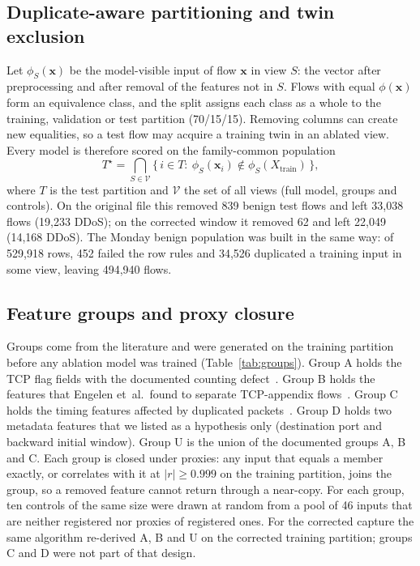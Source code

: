\documentclass[journal]{IEEEtran}
\newcommand{\Tstar}{T^{\star}}
\begin{document}
\subsection{Duplicate-aware partitioning and twin exclusion}
Let $\phi_S(\mathbf{x})$ be the model-visible input of flow $\mathbf{x}$ in view $S$: the vector
after preprocessing and after removal of the features not in $S$. Flows with equal
$\phi(\mathbf{x})$ form an equivalence class, and the split assigns each class as a whole to the
training, validation or test partition (70/15/15). Removing columns can create new equalities, so
a test flow may acquire a training twin in an ablated view. Every model is therefore scored on
the family-common population
\begin{equation}
\Tstar=\bigcap_{S\in\mathcal{V}}\bigl\{\,i\in T:\ \phi_S(\mathbf{x}_i)\notin\phi_S(X_{\mathrm{train}})\,\bigr\},
\label{eq:tstar}
\end{equation}
where $T$ is the test partition and $\mathcal{V}$ the set of all views (full model, groups and
controls). On the original file this removed 839 benign test flows and left 33,038 flows (19,233
DDoS); on the corrected window it removed 62 and left 22,049 (14,168 DDoS).
The Monday benign population was built in the same way: of 529,918 rows, 452 failed the row rules
and 34,526 duplicated a training input in some view, leaving 494,940 flows.

\subsection{Feature groups and proxy closure}
\label{sec:groups}
Groups come from the literature and were generated on the training partition before any ablation
model was trained (Table~\ref{tab:groups}). Group A holds the TCP flag fields with the documented
counting defect~\cite{engelen2021ext}. Group B holds the features that Engelen et~al.\ found to
separate TCP-appendix flows~\cite{engelen2021}. Group C holds the timing features affected by
duplicated packets~\cite{lanvin2023}. Group D holds two metadata features that we listed as a
hypothesis only (destination port and backward initial window). Group U is the union of the
documented groups A, B and C. Each group is closed under proxies: any input that equals a member
exactly, or correlates with it at $|r|\ge0.999$ on the training partition, joins the group, so a
removed feature cannot return through a near-copy. For each group, ten controls of the same size
were drawn at random from a pool of 46 inputs that are neither registered nor proxies of
registered ones. %
For the corrected capture the same algorithm re-derived A, B and U on the corrected training
partition; groups C and D were not part of that design.
\end{document}
